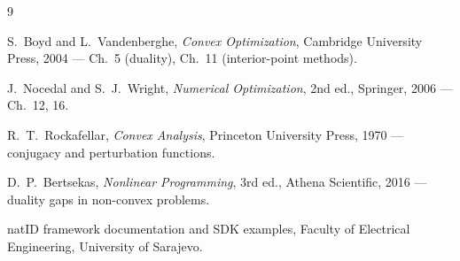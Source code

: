 \documentclass[11pt,a4paper]{article}
\theoremstyle{definition}
\begin{document}
\begin{thebibliography}{9}

 S.~Boyd and L.~Vandenberghe, \emph{Convex Optimization}, Cambridge University
Press, 2004 --- Ch.~5 (duality), Ch.~11 (interior-point methods).

 J.~Nocedal and S.~J.~Wright, \emph{Numerical Optimization}, 2nd ed., Springer,
2006 --- Ch.~12, 16.

 R.~T.~Rockafellar, \emph{Convex Analysis}, Princeton University Press,
1970 --- conjugacy and perturbation functions.

 D.~P.~Bertsekas, \emph{Nonlinear Programming}, 3rd ed., Athena Scientific,
2016 --- duality gaps in non-convex problems.

 natID framework documentation and SDK examples, Faculty of Electrical
Engineering, University of Sarajevo.

\end{thebibliography}
\end{document}
